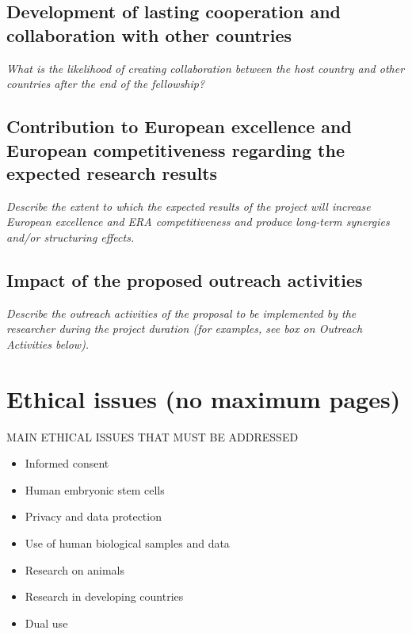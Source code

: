 \documentclass[a4paper,11pt]{article}
\newenvironment{xcomment}{\em}{}
\begin{document}
\subsection{Development of lasting cooperation and collaboration with other countries}
\begin{xcomment}
 What is the likelihood of creating collaboration between the host country and other countries after
the end of the fellowship?
\end{xcomment}

\subsection{Contribution to European excellence and European competitiveness regarding the expected research results}
\begin{xcomment}
Describe the extent to which the expected results of the project will increase European
excellence and ERA competitiveness and produce long-term synergies and/or structuring effects. 
\end{xcomment}

\subsection{Impact of the proposed outreach activities}
\begin{xcomment}
 Describe the outreach activities of the proposal to be implemented by the researcher during the
project duration (for examples, see box on Outreach Activities below).
\end{xcomment}

\newpage


\section{Ethical issues  (no maximum pages)}

MAIN ETHICAL ISSUES THAT MUST BE ADDRESSED
\begin{itemize}
\item Informed consent
\item Human embryonic stem cells
\item Privacy and data protection
\item Use of human biological samples and data
\item Research on animals
\item Research in developing countries
\item Dual use
\end{itemize}
\end{document}
